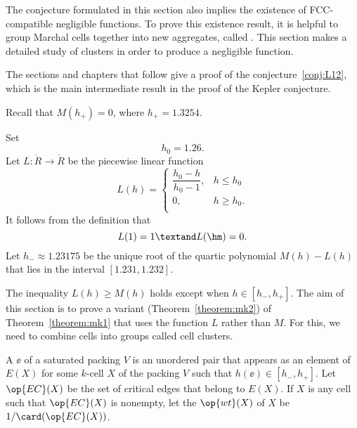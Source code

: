 The conjecture formulated in this section also implies the existence
of FCC-compatible negligible functions.  To prove this existence result, it is
helpful to group Marchal cells together into new aggregates, called
.  This section makes a detailed study of clusters
in order to produce a negligible function.

The sections and chapters that follow give a proof of the
conjecture~\ref{conj:L12},  which is the
main intermediate result in the proof of the Kepler
conjecture.


Recall that $M(h_+) = 0$, where   $h_+ = 1.3254$.
%

\begin{definition}[$L$,~$h_0$,~$h_-$]\label{def:L} 
Set
\[  
h_0 = 1.26.%
\] 
Let $L:\ring{R}\to\ring{R}$ be the piecewise linear function 
\[  
L(h) = \begin{cases} 
\dfrac{h_0-h}{h_0-1}, & h \le h_0 \\
0, & h\ge h_0. \\
\end{cases}
\] 
It follows from the definition that
\[  
L(1) = 1\textand  L(\hm) = 0.
\] 
Let $h_- \approx 1.23175$ be the unique root of the quartic polynomial
$M(h)-L(h)$ that lies in the interval $[1.231,1.232]$.
%
%
%
\end{definition}

\bjliekb

The inequality $L(h)\ge M(h)$ holds except when $h\in [h_-,h_+]$.  The
aim of this section is to prove a variant (Theorem~\ref{theorem:mk2})
of Theorem~\ref{theorem:mk1}
that uses the function $L$ rather than $M$.  For this, we need to
combine cells into groups called cell clusters.

\begin{definition}\label{def:wt} 
A  $\ee$ of a saturated packing $V$ is an unordered pair
that appears as an element of $E(X)$ for some 
$k$-cell $X$ of the packing $V$ such that
$h(\ee)\in[h_-,h_+]$.  Let $\op{EC}(X)$ 
be the set of critical edges that belong to $E(X)$.  If $X$ is any cell such
that $\op{EC}(X)$ is nonempty, let the  $\op{wt}(X)$ of $X$ be
$1/\card(\op{EC}(X))$.
\end{definition}
%
%
%

